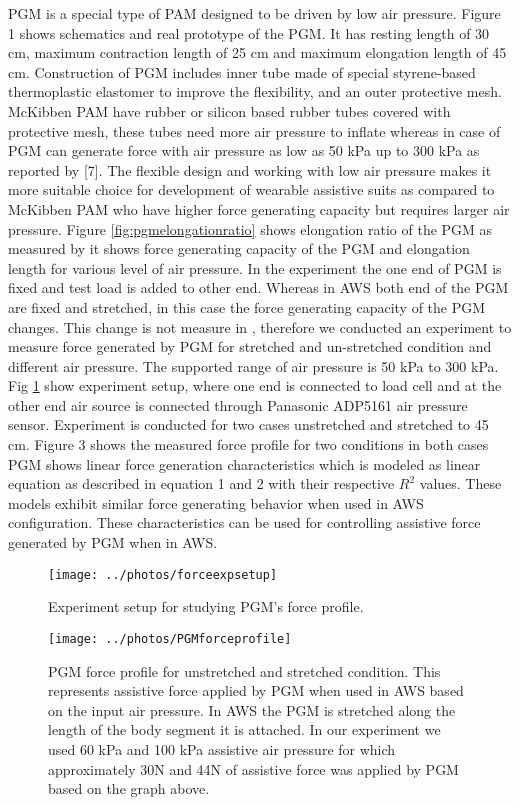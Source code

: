 \documentclass[letterpaper, 10 pt, conference]{ieeeconf}  %
\begin{document}
PGM is a special type of PAM designed to be driven by low air pressure. Figure 1 shows schematics and real prototype of the PGM. It has resting length of 30 cm, maximum contraction length of 25 cm and maximum elongation length of 45 cm. Construction of PGM includes inner tube made of special styrene-based thermoplastic elastomer to improve the flexibility, and an outer protective mesh. McKibben PAM have rubber or silicon based rubber tubes covered with protective mesh, these tubes need more air pressure to inflate whereas in case of PGM can generate force with air pressure as low as 50 kPa up to 300 kPa as reported by [7]. The flexible design and working with low air pressure makes it more suitable choice for development of wearable assistive suits as compared to McKibben PAM who have higher force generating capacity but requires larger air pressure. Figure \ref{fig:pgmelongationratio} shows elongation ratio of the PGM as measured by \cite{7} it shows force generating capacity of the PGM and elongation length for various level of air pressure. In the experiment the one end of PGM is fixed and test load is added to other end. Whereas in AWS both end of the PGM are fixed and stretched, in this case the force generating capacity of the PGM changes. This change is not measure in \cite{7}, therefore we conducted an experiment to measure force generated by PGM for stretched and un-stretched condition and different air pressure. The supported range of air pressure is 50 kPa to 300 kPa. Fig \ref{fig:pgmtest} show experiment setup, where one end is connected to load cell and at the other end air source is connected through Panasonic ADP5161 air pressure sensor. Experiment is conducted for two cases unstretched and stretched to 45 cm. Figure 3 shows the measured force profile for two conditions in both cases PGM shows linear force generation characteristics which is modeled as linear equation as described in equation 1 and 2 with their respective $R^2$ values. These models exhibit similar force generating behavior when used in AWS configuration. These characteristics can be used for controlling assistive force generated by PGM when in AWS.

\begin{figure}
	\centering
	\texttt{[image: ../photos/forceexpsetup]}
	\caption{Experiment setup for studying PGM's force profile.}
	\label{fig:pgmtest}
\end{figure}

\begin{figure}
	\centering
	\texttt{[image: ../photos/PGMforceprofile]}
	\caption{PGM force profile for unstretched and stretched condition. This represents assistive force applied by PGM when used in AWS based on the input air pressure. In AWS the PGM is stretched along the length of the body segment it is attached. In our experiment we used 60 kPa and 100 kPa assistive air pressure for which approximately 30N and 44N of assistive force was applied by PGM based on the graph above.}
	\label{fig:pgmforceprofile}
\end{figure}
\end{document}
